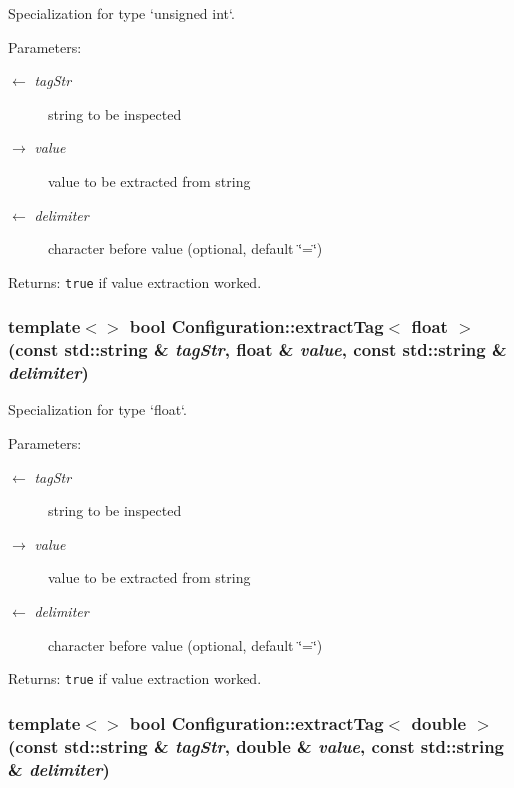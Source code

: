 Specialization for type `unsigned int`. 

\begin{Desc}
\item[Parameters:]
\begin{description}
\item[\mbox{$\leftarrow$} {\em tag\-Str}]string to be inspected \item[\mbox{$\rightarrow$} {\em value}]value to be extracted from string \item[\mbox{$\leftarrow$} {\em delimiter}]character before value (optional, default \char`\"{}=\char`\"{})\end{description}
\end{Desc}
\begin{Desc}
\item[Returns:]{\tt true} if value extraction worked. \end{Desc}
\hypertarget{namespaceConfiguration_bdc6610189d8622499b18cf9dd955e01}{
\subsubsection[extractTag]{\setlength{\rightskip}{0pt plus 5cm}template$<$$>$ bool Configuration::extract\-Tag$<$ float $>$ (const std::string \& {\em tag\-Str}, float \& {\em value}, const std::string \& {\em delimiter})}}
\label{namespaceConfiguration_bdc6610189d8622499b18cf9dd955e01}


Specialization for type `float`. 

\begin{Desc}
\item[Parameters:]
\begin{description}
\item[\mbox{$\leftarrow$} {\em tag\-Str}]string to be inspected \item[\mbox{$\rightarrow$} {\em value}]value to be extracted from string \item[\mbox{$\leftarrow$} {\em delimiter}]character before value (optional, default \char`\"{}=\char`\"{})\end{description}
\end{Desc}
\begin{Desc}
\item[Returns:]{\tt true} if value extraction worked. \end{Desc}
\hypertarget{namespaceConfiguration_39f1934324f5782301ac4372c970bbd7}{
\subsubsection[extractTag]{\setlength{\rightskip}{0pt plus 5cm}template$<$$>$ bool Configuration::extract\-Tag$<$ double $>$ (const std::string \& {\em tag\-Str}, double \& {\em value}, const std::string \& {\em delimiter})}}
\label{namespaceConfiguration_39f1934324f5782301ac4372c970bbd7}


